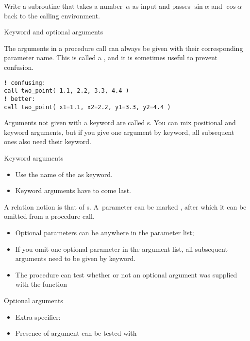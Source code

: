 \begin{exercise}
  \label{ex:ffunc-sin-cos}
  Write a subroutine  that takes a number~$\alpha$ as input
  and passes $\sin\alpha$ and $\cos\alpha$ back to the calling
  environment.
\end{exercise}

 {Keyword and optional arguments}

The arguments in a procedure call can always be given with their
corresponding parameter name.
This is called a ,
and it is sometimes useful to prevent confusion.
\begin{lstlisting}
! confusing:
call two_point( 1.1, 2.2, 3.3, 4.4 )
! better:  
call two_point( x1=1.1, x2=2.2, y1=3.3, y2=4.4 )
\end{lstlisting}
Arguments not given with a keyword are called
s.
You can mix positional and keyword arguments,
but if you give one argument by keyword, all subsequent ones
also need their keyword.

\begin{block}{Keyword arguments}
  \label{sl:funcf:keyword}
  \begin{itemize}
  \item Use the name of the  as
    keyword.
  \item Keyword arguments have to come last.
  \end{itemize}
\end{block}

A relation notion is that of s.
A~parameter can be marked , after which
it can be omitted from a procedure call.
\begin{itemize}
\item Optional parameters can be anywhere in the parameter list;
\item If you omit one optional parameter in the argument list,
  all subsequent arguments need to be given by keyword.
\item The procedure can test whether or not an optional argument was supplied
   with the function 
\end{itemize}

\begin{block}{Optional arguments}
  \label{sl:funcf:optional}
  \begin{itemize}
  \item Extra specifier: 
  \item Presence of argument can be tested with 
  \end{itemize}
\end{block}


